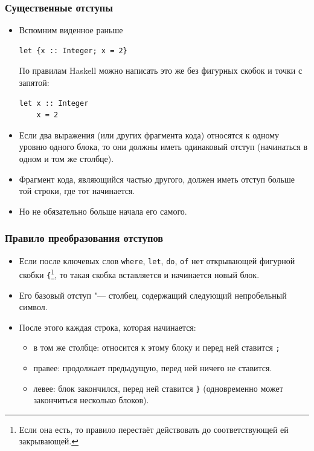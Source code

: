 \documentclass[10pt]{beamer}
\begin{document}
\begin{frame}[fragile]
\frametitle{Существенные отступы}
\begin{itemize}
    \item Вспомним виденное раньше
\begin{lstlisting}
let {x :: Integer; x = 2}
\end{lstlisting}
По правилам Haskell можно написать это же без фигурных скобок и точки с запятой:
\begin{lstlisting}
let x :: Integer
    x = 2
\end{lstlisting}
\item Если два выражения (или других фрагмента кода) относятся к одному уровню одного блока, то они должны иметь одинаковый отступ (начинаться в одном и том же столбце).
\item Фрагмент кода, являющийся частью другого, должен иметь отступ больше той строки, где тот начинается.
\item Но не обязательно больше начала его самого.
\end{itemize}
\end{frame}
\begin{frame}[fragile]
\frametitle{Правило преобразования отступов}
\begin{itemize}
\item Если после ключевых слов \lstinline|where|, \lstinline|let|, \lstinline|do|, \lstinline|of| нет открывающей фигурной скобки \lstinline|{|\footnote{Если она есть, то правило перестаёт действовать до соответствующей ей закрывающей.}, то такая скобка вставляется и начинается новый блок.
\item Его базовый отступ "--- столбец, содержащий следующий непробельный символ.
\item После этого каждая строка, которая начинается:
\begin{itemize}
    \item в том же столбце: относится к этому блоку и перед ней ставится \lstinline|;|
    \item правее: продолжает предыдущую, перед ней ничего не ставится.
    \item левее: блок закончился, перед ней ставится \lstinline|}| (одновременно может закончиться несколько блоков).
\end{itemize}
\end{itemize}
\end{frame}
\end{document}
